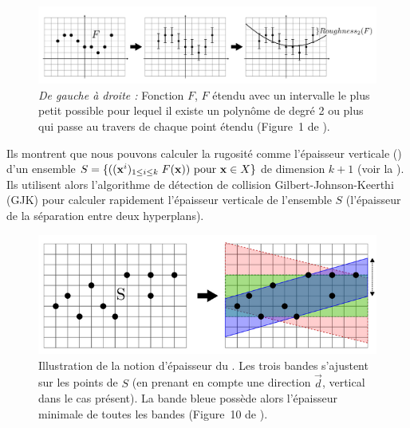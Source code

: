 \begin{figure}[ht]{
    \begin{center}
    \includegraphics[width=14cm]{images/Curvature/DLL_roughness}
    \end{center}}
    \caption[Illustration du paramètre $R$ de rugosité de \DLL.]{\emph{De gauche à
    droite : } Fonction $F$, $F$ étendu avec un intervalle le plus petit
    possible pour lequel il existe un polynôme de degré 2 ou plus qui passe au
    travers de chaque point étendu (Figure~1 de
    \cite{Provot2011}).\label{fig:dll-roughness}}
\end{figure}

Ils montrent que nous pouvons calculer la rugosité comme l'épaisseur
verticale () d'un ensemble $S = \{((\mathbf{x}^i)_{1 \le i
\le k} \; F(\mathbf{x})) \text{ pour } \mathbf{x} \in X \}$ de dimension $k + 1$ (voir la
). Ils utilisent alors l'algorithme de détection
de collision Gilbert-Johnson-Keerthi (GJK) \cite{Gilbert1988} pour calculer
rapidement l'épaisseur verticale de l'ensemble $S$ (l'épaisseur de la séparation
entre deux hyperplans).

\begin{figure}[ht]{
    \begin{center}
    \includegraphics[width=14cm]{images/Curvature/DLL_roughness2}
    \end{center}}
    \caption[Illustration de la notion d'épaisseur du \DLL.]{Illustration de la
    notion d'épaisseur du \DLL. Les trois bandes s'ajustent sur les points de
    $S$ (en prenant en compte une direction $\vec{d}$, vertical dans le cas présent).
    La bande bleue possède alors l'épaisseur minimale de toutes les bandes
    (Figure~10 de \cite{ProvotIPOL2014}).\label{fig:dll-roughness2}}
\end{figure}

